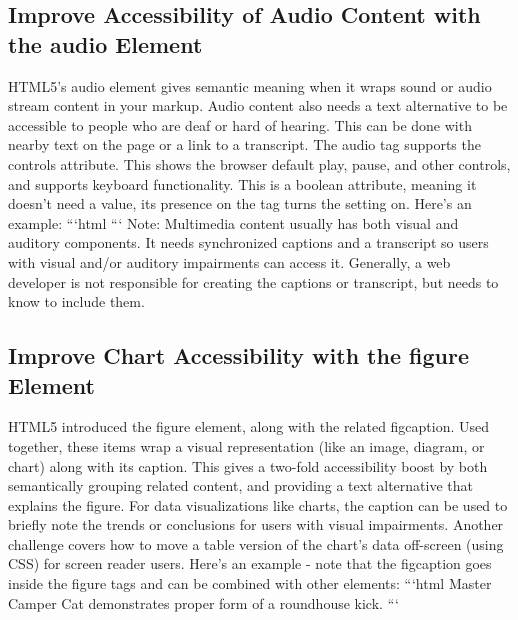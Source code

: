 \documentclass{article}%
\begin{document}
\subsection{Improve Accessibility of Audio Content with the audio Element}%
\label{subsec:ImproveAccessibilityofAudioContentwiththeaudioElement}%
HTML5's audio element gives semantic meaning when it wraps sound or audio stream content in your markup. Audio content also needs a text alternative to be accessible to people who are deaf or hard of hearing. This can be done with nearby text on the page or a link to a transcript.\newline%
The audio tag supports the controls attribute. This shows the browser default play, pause, and other controls, and supports keyboard functionality. This is a boolean attribute, meaning it doesn't need a value, its presence on the tag turns the setting on.\newline%
Here's an example:\newline%
```html\newline%
\newline%
```\newline%
Note: Multimedia content usually has both visual and auditory components. It needs synchronized captions and a transcript so users with visual and/or auditory impairments can access it. Generally, a web developer is not responsible for creating the captions or transcript, but needs to know to include them.\newline%

%
\subsection{Improve Chart Accessibility with the figure Element}%
\label{subsec:ImproveChartAccessibilitywiththefigureElement}%
HTML5 introduced the figure element, along with the related figcaption. Used together, these items wrap a visual representation (like an image, diagram, or chart) along with its caption. This gives a two{-}fold accessibility boost by both semantically grouping related content, and providing a text alternative that explains the figure.\newline%
For data visualizations like charts, the caption can be used to briefly note the trends or conclusions for users with visual impairments. Another challenge covers how to move a table version of the chart's data off{-}screen (using CSS) for screen reader users.\newline%
Here's an example {-} note that the figcaption goes inside the figure tags and can be combined with other elements:\newline%
```html\newline%
\newline%
    Master Camper Cat demonstrates proper form of a roundhouse kick.\newline%
  \newline%
```\newline%
\end{document}
